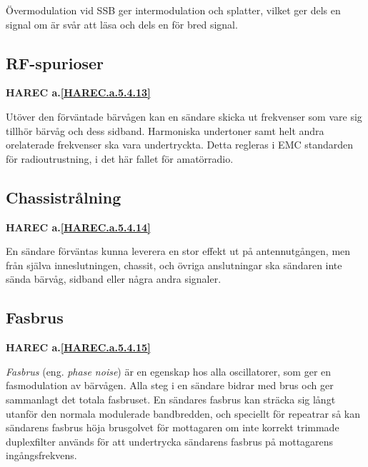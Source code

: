 Övermodulation vid SSB ger intermodulation och splatter, vilket ger dels en
signal om är svår att läsa och dels en för bred signal.

\subsection{RF-spurioser}
\textbf{HAREC
  a.\ref{HAREC.a.5.4.13}\label{myHAREC.a.5.4.13}
}

Utöver den förväntade bärvågen kan en sändare skicka ut frekvenser som vare
sig tillhör bärvåg och dess sidband. Harmoniska undertoner samt helt andra
orelaterade frekvenser ska vara undertryckta.
Detta regleras i EMC standarden för radioutrustning, i det här fallet för
amatörradio.

\subsection{Chassistrålning}
\textbf{HAREC
  a.\ref{HAREC.a.5.4.14}\label{myHAREC.a.5.4.14}
}

En sändare förväntas kunna leverera en stor effekt ut på antennutgången, men
från själva inneslutningen, chassit, och övriga anslutningar ska sändaren
inte sända bärvåg, sidband eller några andra signaler.

\subsection{Fasbrus}
\textbf{HAREC
  a.\ref{HAREC.a.5.4.15}\label{myHAREC.a.5.4.15}
}

\emph{Fasbrus} (eng. \emph{phase noise}) är en egenskap hos alla oscillatorer,
som ger en fasmodulation av bärvågen.
Alla steg i en sändare bidrar med brus och ger sammanlagt det totala fasbruset.
En sändares fasbrus kan sträcka sig långt utanför den normala modulerade
bandbredden, och speciellt för repeatrar så kan sändarens fasbrus höja
brusgolvet för mottagaren om inte korrekt trimmade duplexfilter
används för att undertrycka sändarens fasbrus på mottagarens ingångsfrekvens.
